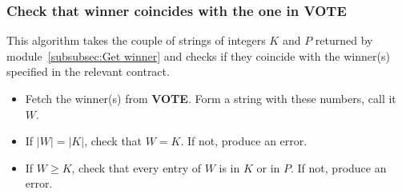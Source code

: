 \documentclass[submission, copyright,creativecommons,sharealike,noncommercial]{eptcs}
\newcommand{\Vote}{\textbf{VOTE}\xspace}
\begin{document}
\subsubsection{Check that winner coincides with the one in \Vote}\label{subsubsec:Final check}
	This algorithm takes the couple of strings of integers $K$ and $P$ returned by module~\ref{subsubsec:Get winner} and checks if they coincide with the winner(s) specified in the relevant contract.
	\begin{itemize}
		\item Fetch the winner(s) from \Vote. Form a string with these numbers, call it $W$. 
		\item If $|W| = |K|$, check that $W = K$. If not, produce an error.
		\item If $W \geq K$, check that every entry of $W$ is in $K$ or in $P$. If not, produce an error.
	\end{itemize}

\printbibliography
\end{document}
